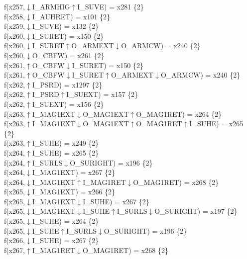 f(x257,$\downarrow$I\_ARMHIG$\uparrow$I\_SUVE) = x281 \{2\} \\  
f(x258,$\downarrow$I\_AUHRET) = x101 \{2\} \\  
f(x259,$\downarrow$I\_SUVE) = x132 \{2\} \\  
f(x260,$\downarrow$I\_SURET) = x150 \{2\} \\  
f(x260,$\downarrow$I\_SURET$\uparrow$O\_ARMEXT$\downarrow$O\_ARMCW) = x240 \{2\} \\  
f(x260,$\downarrow$O\_CBFW) = x261 \{2\} \\  
f(x261,$\uparrow$O\_CBFW$\downarrow$I\_SURET) = x150 \{2\} \\  
f(x261,$\uparrow$O\_CBFW$\downarrow$I\_SURET$\uparrow$O\_ARMEXT$\downarrow$O\_ARMCW) = x240 \{2\} \\  
f(x262,$\uparrow$I\_PSRD) = x1297 \{2\} \\  
f(x262,$\uparrow$I\_PSRD$\uparrow$I\_SUEXT) = x157 \{2\} \\  
f(x262,$\uparrow$I\_SUEXT) = x156 \{2\} \\  
f(x263,$\uparrow$I\_MAG1EXT$\downarrow$O\_MAG1EXT$\uparrow$O\_MAG1RET) = x264 \{2\} \\  
f(x263,$\uparrow$I\_MAG1EXT$\downarrow$O\_MAG1EXT$\uparrow$O\_MAG1RET$\uparrow$I\_SUHE) = x265 \{2\} \\  
f(x263,$\uparrow$I\_SUHE) = x249 \{2\} \\  
f(x264,$\uparrow$I\_SUHE) = x265 \{2\} \\  
f(x264,$\uparrow$I\_SURLS$\downarrow$O\_SURIGHT) = x196 \{2\} \\  
f(x264,$\downarrow$I\_MAG1EXT) = x267 \{2\} \\  
f(x264,$\downarrow$I\_MAG1EXT$\uparrow$I\_MAG1RET$\downarrow$O\_MAG1RET) = x268 \{2\} \\  
f(x265,$\downarrow$I\_MAG1EXT) = x266 \{2\} \\  
f(x265,$\downarrow$I\_MAG1EXT$\downarrow$I\_SUHE) = x267 \{2\} \\  
f(x265,$\downarrow$I\_MAG1EXT$\downarrow$I\_SUHE$\uparrow$I\_SURLS$\downarrow$O\_SURIGHT) = x197 \{2\} \\  
f(x265,$\downarrow$I\_SUHE) = x264 \{2\} \\  
f(x265,$\downarrow$I\_SUHE$\uparrow$I\_SURLS$\downarrow$O\_SURIGHT) = x196 \{2\} \\  
f(x266,$\downarrow$I\_SUHE) = x267 \{2\} \\  
f(x267,$\uparrow$I\_MAG1RET$\downarrow$O\_MAG1RET) = x268 \{2\} \\  
